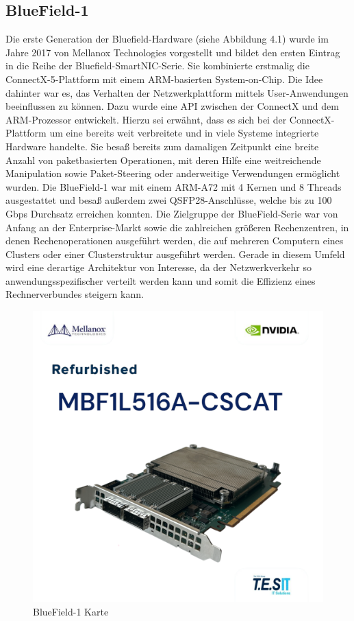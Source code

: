 \subsection{BlueField-1}
Die erste Generation der Bluefield-Hardware (siehe Abbildung 4.1) wurde im Jahre 2017 von Mellanox Technologies vorgestellt und bildet den ersten Eintrag in die Reihe der Bluefield-SmartNIC-Serie. Sie kombinierte erstmalig die ConnectX-5-Plattform mit einem ARM-basierten System-on-Chip. Die Idee dahinter war es, das Verhalten der Netzwerkplattform mittels User-Anwendungen beeinflussen zu können. Dazu wurde eine API zwischen der ConnectX und dem ARM-Prozessor entwickelt. Hierzu sei erwähnt, dass es sich bei der ConnectX-Plattform um eine bereits weit verbreitete und in viele Systeme integrierte Hardware handelte. Sie besaß bereits zum damaligen Zeitpunkt eine breite Anzahl von paketbasierten Operationen, mit deren Hilfe eine weitreichende Manipulation sowie Paket-Steering oder anderweitige Verwendungen ermöglicht wurden. Die BlueField-1 war mit einem ARM-A72 mit 4 Kernen und 8 Threads ausgestattet und besaß außerdem zwei QSFP28-Anschlüsse, welche bis zu 100 Gbps Durchsatz erreichen konnten. Die Zielgruppe der BlueField-Serie war von Anfang an der Enterprise-Markt sowie die zahlreichen größeren Rechenzentren, in denen Rechenoperationen ausgeführt werden, die auf mehreren Computern eines Clusters oder einer Clusterstruktur ausgeführt werden. Gerade in diesem Umfeld wird eine derartige Architektur von Interesse, da der Netzwerkverkehr so anwendungsspezifischer verteilt werden kann und somit die Effizienz eines Rechnerverbundes steigern kann. \cite{bluefieldhistory}
\begin{figure}
    \centering
    \includegraphics[width=0.65\linewidth]{images/s-l1600.png}
    \caption{BlueField-1 Karte \cite{ebay_bluefield1_2025}}
    \label{fig:enter-label}
\end{figure}
